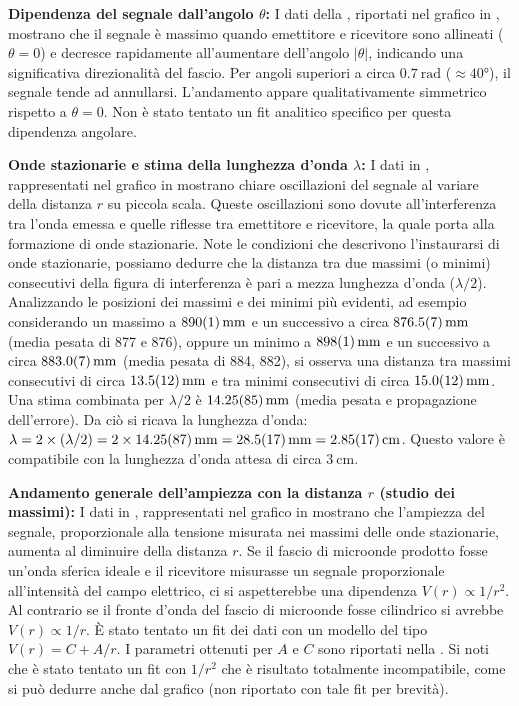 \documentclass[a4paper]{article}
\begin{document}
\textbf{Dipendenza del segnale dall'angolo $\theta$:}
I dati della , riportati nel grafico in , mostrano che il segnale è massimo quando emettitore e ricevitore sono allineati ($\theta=0$) e decresce rapidamente all'aumentare dell'angolo $|\theta|$, indicando una significativa direzionalità del fascio. Per angoli superiori a circa $\SI{0.7}{\radian}$ ($\approx \ang{40}$), il segnale tende ad annullarsi. L'andamento appare qualitativamente simmetrico rispetto a $\theta=0$. Non è stato tentato un fit analitico specifico per questa dipendenza angolare.

\textbf{Onde stazionarie e stima della lunghezza d'onda $\lambda$:}
I dati in , rappresentati nel grafico in  mostrano chiare oscillazioni del segnale al variare della distanza $r$ su piccola scala. Queste oscillazioni sono dovute all'interferenza tra l'onda emessa e quelle riflesse tra emettitore e ricevitore, la quale porta alla formazione di onde stazionarie. Note le condizioni che descrivono l'instaurarsi di onde stazionarie, possiamo dedurre che la distanza tra due massimi (o minimi) consecutivi della figura di interferenza è pari a mezza lunghezza d'onda ($\lambda/2$).
Analizzando le posizioni dei massimi e dei minimi più evidenti, ad esempio considerando un massimo a $\SI{890 \pm 1}{\milli\metre}$ e un successivo a circa $\SI{876.5 \pm 0.7}{\milli\metre}$ (media pesata di 877 e 876), oppure un minimo a $\SI{898 \pm 1}{\milli\metre}$ e un successivo a circa $\SI{883 \pm 0.7}{\milli\metre}$ (media pesata di 884, 882), si osserva una distanza tra massimi consecutivi di circa $\SI{13.5 \pm 1.2}{\milli\metre}$ e tra minimi consecutivi di circa $\SI{15 \pm 1.2}{\milli\metre}$. Una stima combinata per $\lambda/2$ è $\SI{14.25 \pm 0.85}{\milli\metre}$ (media pesata e propagazione dell'errore).
Da ciò si ricava la lunghezza d'onda:
$\lambda = 2 \times (\lambda/2) = 2 \times \SI{14.25 \pm 0.87}{\milli\metre} = \SI{28.5 \pm 1.7}{\milli\metre} = \SI{2.85 \pm 0.17}{\centi\metre}$.
Questo valore è compatibile con la lunghezza d'onda attesa di circa $\SI{3}{\centi\metre}$.

\textbf{Andamento generale dell'ampiezza con la distanza $r$ (studio dei massimi):}
I dati in , rappresentati nel grafico in  mostrano che l'ampiezza del segnale, proporzionale alla tensione misurata nei massimi delle onde stazionarie, aumenta al diminuire della distanza $r$. Se il fascio di microonde prodotto fosse un'onda sferica ideale e il ricevitore misurasse un segnale proporzionale all'intensità del campo elettrico, ci si aspetterebbe una dipendenza $V(r) \propto 1/r^2$. Al contrario se il fronte d'onda del fascio di microonde fosse cilindrico si avrebbe $V(r) \propto 1/r$.
È stato tentato un fit dei dati con un modello del tipo $V(r) = C + A/r$. I parametri ottenuti per $A$ e $C$ sono riportati nella . Si noti che è stato tentato un fit con $1/r^2$ che è risultato totalmente incompatibile, come si può dedurre anche dal grafico (non riportato con tale fit per brevità).
\end{document}
